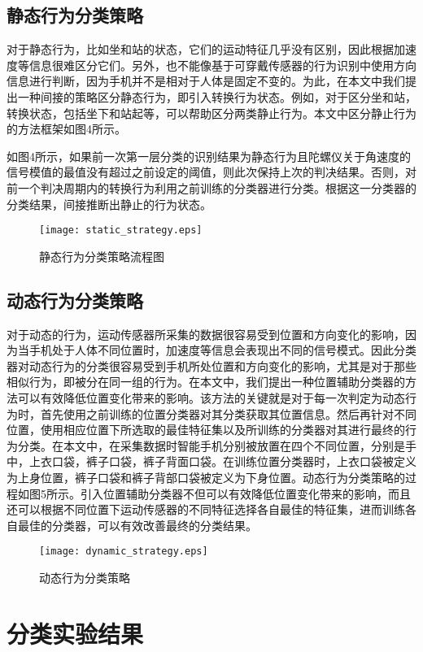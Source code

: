 \subsection{静态行为分类策略}
\par 对于静态行为，比如坐和站的状态，它们的运动特征几乎没有区别，因此根据加速度等信息很难区分它们。另外，也不能像基于可穿戴传感器的行为识别中使用方向信息进行判断，因为手机并不是相对于人体是固定不变的。为此，在本文中我们提出一种间接的策略区分静态行为，即引入转换行为状态。例如，对于区分坐和站，转换状态，包括坐下和站起等，可以帮助区分两类静止行为。本文中区分静止行为的方法框架如图4所示。
\par 如图4所示，如果前一次第一层分类的识别结果为静态行为且陀螺仪关于角速度的信号模值的最值没有超过之前设定的阈值，则此次保持上次的判决结果。否则，对前一个判决周期内的转换行为利用之前训练的分类器进行分类。根据这一分类器的分类结果，间接推断出静止的行为状态。
\begin{figure}[!htp]
\centering
\texttt{[image: static\_strategy.eps]}
\caption{静态行为分类策略流程图}
\end{figure}

\subsection{动态行为分类策略}
\par 对于动态的行为，运动传感器所采集的数据很容易受到位置和方向变化的影响，因为当手机处于人体不同位置时，加速度等信息会表现出不同的信号模式。因此分类器对动态行为的分类很容易受到手机所处位置和方向变化的影响，尤其是对于那些相似行为，即被分在同一组的行为。在本文中，我们提出一种位置辅助分类器的方法可以有效降低位置变化带来的影响。该方法的关键就是对于每一次判定为动态行为时，首先使用之前训练的位置分类器对其分类获取其位置信息。然后再针对不同位置，使用相应位置下所选取的最佳特征集以及所训练的分类器对其进行最终的行为分类。在本文中，在采集数据时智能手机分别被放置在四个不同位置，分别是手中，上衣口袋，裤子口袋，裤子背面口袋。在训练位置分类器时，上衣口袋被定义为上身位置，裤子口袋和裤子背部口袋被定义为下身位置。动态行为分类策略的过程如图5所示。引入位置辅助分类器不但可以有效降低位置变化带来的影响，而且还可以根据不同位置下运动传感器的不同特征选择各自最佳的特征集，进而训练各自最佳的分类器，可以有效改善最终的分类结果。
\begin{figure}[!htp]
 \centering
 \texttt{[image: dynamic\_strategy.eps]}
 \caption{动态行为分类策略}
\end{figure}


\section{分类实验结果}
